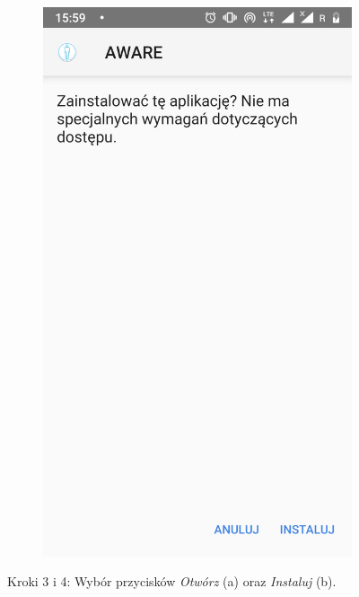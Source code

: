 \begin{enumerate}
\begin{figure}[H]
\begin{subfigure}{0.35\textwidth}
			\subcaption{\label{subfigure_a}}
		\end{subfigure}
		\begin{subfigure}{0.35\textwidth}
			\centering
			\includegraphics[scale=0.14]{dodatekA/2_4.png}
			\subcaption{\label{subfigure_b}}
		\end{subfigure}
		\caption{ Kroki 3 i 4: Wybór przycisków \textit{Otwórz} (a) oraz \textit{Instaluj} (b).}
	\end{figure}
	\clearpage 
	

\end{enumerate}
